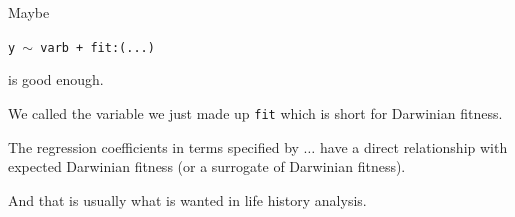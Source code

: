 \documentclass[
  ignorenonframetext,
]{beamer}
\begin{document}
\begin{frame}{}
\protect\hypertarget{section-18}{}
Maybe

\begin{center}
  \texttt{y $\sim$ varb + fit:(...)}
\end{center}

is good enough.

We called the variable we just made up \texttt{fit} which is short for
Darwinian fitness.

The regression coefficients in terms specified by \(\ldots\) have a
direct relationship with expected Darwinian fitness (or a surrogate of
Darwinian fitness).

And that is usually what is wanted in life history analysis.
\end{frame}
\end{document}
